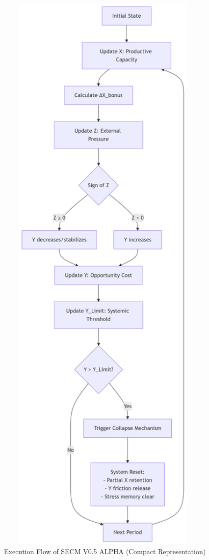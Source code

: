 \documentclass[12pt,a4paper]{article}
\begin{document}
\begin{figure}[H]
    \centering
    \includegraphics[width=0.95\textwidth]{secm_flowchart.png}
    \caption{Execution Flow of SECM V0.5 ALPHA (Compact Representation)}
    \label{fig:flowchart}
\end{figure}
\end{document}

